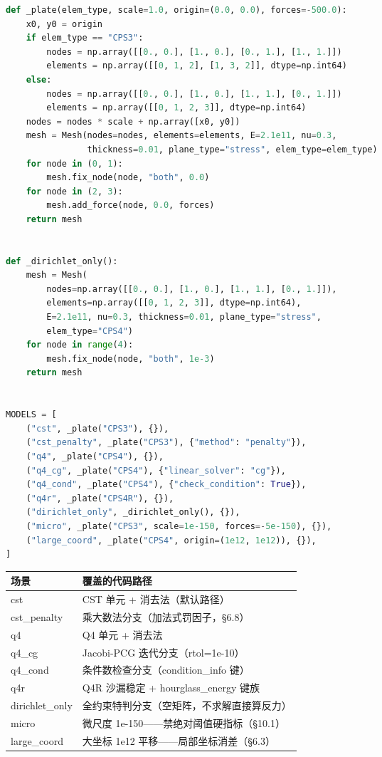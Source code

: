 \documentclass[12pt,a4paper]{ctexart}
\begin{document}
\begin{lstlisting}[language=python]
def _plate(elem_type, scale=1.0, origin=(0.0, 0.0), forces=-500.0):
    x0, y0 = origin
    if elem_type == "CPS3":
        nodes = np.array([[0., 0.], [1., 0.], [0., 1.], [1., 1.]])
        elements = np.array([[0, 1, 2], [1, 3, 2]], dtype=np.int64)
    else:
        nodes = np.array([[0., 0.], [1., 0.], [1., 1.], [0., 1.]])
        elements = np.array([[0, 1, 2, 3]], dtype=np.int64)
    nodes = nodes * scale + np.array([x0, y0])
    mesh = Mesh(nodes=nodes, elements=elements, E=2.1e11, nu=0.3,
                thickness=0.01, plane_type="stress", elem_type=elem_type)
    for node in (0, 1):
        mesh.fix_node(node, "both", 0.0)
    for node in (2, 3):
        mesh.add_force(node, 0.0, forces)
    return mesh


def _dirichlet_only():
    mesh = Mesh(
        nodes=np.array([[0., 0.], [1., 0.], [1., 1.], [0., 1.]]),
        elements=np.array([[0, 1, 2, 3]], dtype=np.int64),
        E=2.1e11, nu=0.3, thickness=0.01, plane_type="stress",
        elem_type="CPS4")
    for node in range(4):
        mesh.fix_node(node, "both", 1e-3)
    return mesh


MODELS = [
    ("cst", _plate("CPS3"), {}),
    ("cst_penalty", _plate("CPS3"), {"method": "penalty"}),
    ("q4", _plate("CPS4"), {}),
    ("q4_cg", _plate("CPS4"), {"linear_solver": "cg"}),
    ("q4_cond", _plate("CPS4"), {"check_condition": True}),
    ("q4r", _plate("CPS4R"), {}),
    ("dirichlet_only", _dirichlet_only(), {}),
    ("micro", _plate("CPS3", scale=1e-150, forces=-5e-150), {}),
    ("large_coord", _plate("CPS4", origin=(1e12, 1e12)), {}),
]
\end{lstlisting}

\begin{table}[h]
\centering
\small
\begin{tabular}{p{3.2cm}p{10cm}}
\toprule
\textbf{场景} & \textbf{覆盖的代码路径} \\
\midrule
cst & CST 单元 + 消去法（默认路径） \\
cst\_penalty & 乘大数法分支（加法式罚因子，§6.8） \\
q4 & Q4 单元 + 消去法 \\
q4\_cg & Jacobi-PCG 迭代分支（rtol=1e-10） \\
q4\_cond & 条件数检查分支（condition\_info 键） \\
q4r & Q4R 沙漏稳定 + hourglass\_energy 键族 \\
dirichlet\_only & 全约束特判分支（空矩阵，不求解直接算反力） \\
micro & 微尺度 1e-150——禁绝对阈值硬指标（§10.1） \\
large\_coord & 大坐标 1e12 平移——局部坐标消差（§6.3） \\
\bottomrule
\end{tabular}
\end{table}
\end{document}
